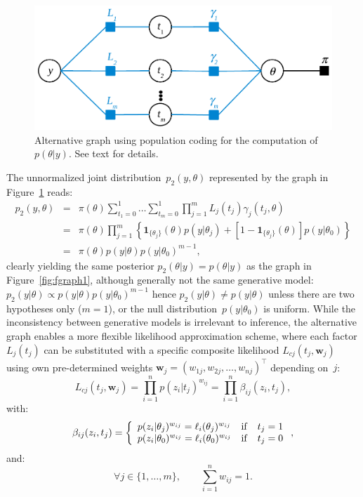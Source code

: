 \documentclass[english]{scrartcl}
\begin{document}
\begin{figure}[!ht]
  \begin{center}
    \includegraphics[width=.6\textwidth]{fgraph3.pdf}
  \end{center}
\caption{Alternative graph using population coding for the computation of $p(\theta|y)$. See text for details.}
\label{fig:fgraph3}
\end{figure}

The unnormalized joint distribution~$p_2(y,\theta)$ represented by the graph in Figure~\ref{fig:fgraph3} reads:
\begin{eqnarray*}
p_2(y,\theta) 
& = & 
\pi(\theta) \sum_{t_1=0}^{1}\ldots \sum_{t_m=0}^{1} 
\prod_{j=1}^m L_j(t_j) \gamma_j(t_j,\theta) \\
& = & 
\pi(\theta)  
\prod_{j=1}^m \left\{ 
\mathbf{1}_{\{\theta_j\}}(\theta) p(y|\theta_j) + [1-\mathbf{1}_{\{\theta_j\}}(\theta)]p(y|\theta_0)
\right\}\\
& = & 
\pi(\theta) p(y|\theta) p(y|\theta_0)^{m-1}
,
\end{eqnarray*}
clearly yielding the same posterior $p_2(\theta|y)=p(\theta|y)$ as the graph in Figure~\ref{fig:fgraph1}, although generally not the same generative model: $p_2(y|\theta)\propto p(y|\theta)p(y|\theta_0)^{m-1}$ hence $p_2(y|\theta)\not=p(y|\theta)$ unless there are two hypotheses only ($m=1$), or the null distribution~$p(y|\theta_0)$ is uniform. While the inconsistency between generative models is irrelevant to inference, the alternative graph enables a more flexible likelihood approximation scheme, where each factor $L_j(t_j)$ can be substituted with a specific composite likelihood $L_{cj}(t_j, \mathbf{w}_j)$ using own pre-determined weights $\mathbf{w}_j=(w_{1j},w_{2j},\ldots,w_{nj})^\top$ depending on~$j$:
$$
L_{cj}(t_j, \mathbf{w}_j) 
= \prod_{i=1}^n p(z_i|t_j)^{w_{ij}}
= \prod_{i=1}^n \beta_{ij}(z_i, t_j),
$$
with:
\begin{equation}
\label{eq:factor_beta}
\beta_{ij}(z_i, t_j)
= 
\left\{
\begin{array}{lll}
p(z_i|\theta_j)^{w_{ij}} = \ell_i (\theta_j)^{w_{ij}} & {\rm if} & t_j=1 \\
p(z_i|\theta_0)^{w_{ij}} = \ell_i (\theta_0)^{w_{ij}} & {\rm if} & t_j=0
\end{array}
\right.
,
\end{equation}
and:
$$
\forall j \in \{1,\ldots,m\},
\qquad
\sum_{i=1}^n w_{ij} = 1
.
$$
\end{document}
